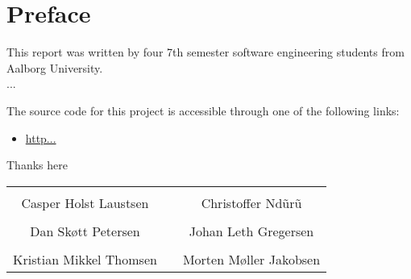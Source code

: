 \thispagestyle{empty}
\section*{Preface}
This report was written by four 7th semester software engineering students from Aalborg University.\\

...

\noindent The source code for this project is accessible through one of the following links:
\begin{itemize}
\item \url{http...}
\end{itemize}

\vspace{.2cm}
\noindent Thanks here

\begin{table}[H]
	\centering
	\vspace{2cm}
		\begin{tabular}{c c c}
			\underline{\phantom{JAERJAERJAERJAERGO}} & \phantom{cookies} & \underline{\phantom{JAERJAERJAERJAERGO}} \\
			Casper Holst Laustsen & \phantom{cookies} & Christoffer Ndũrũ\\[1.5cm]
		    \underline{\phantom{JAERJAERJAERJAERGO}} & \phantom{cookies} & \underline{\phantom{JAERJAERJAERJAERGO}} \\
			Dan Skøtt Petersen & \phantom{cookies} & Johan Leth Gregersen\\[1.5cm]
			\underline{\phantom{JAERJAERJAERJAERGO}} & \phantom{cookies} & \underline{\phantom{JAERJAERJAERJAERGO}} \\ 
			Kristian Mikkel Thomsen & \phantom{cookies} & Morten Møller Jakobsen\\[.5cm]				
		\end{tabular}
\end{table}